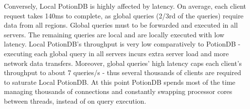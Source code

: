 \documentclass[sigconf, nonacm]{acmart}
\begin{document}
Conversely, Local PotionDB is highly affected by latency.
On average, each client request takes 140ms to complete, as global queries (2/3rd of the queries) require data from all regions.
Global queries must to be forwarded and executed in all servers.
The remaining queries are local and are locally executed with low latency.
Local PotionDB's throughput is very low comparatively to PotionDB - executing each global query in all servers incurs extra server load and more network data transfers.
Moreover, global queries' high latency caps each client's throughput to about 7 queries/s - thus several thousands of clients are required to saturate Local PotionDB.
At this point PotionDB spends most of the time managing thousands of connections and constantly swapping processor cores between threads, instead of on query execution.
\end{document}
